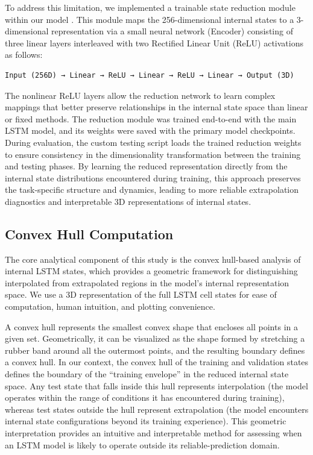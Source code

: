 \documentclass{article}
\begin{document}
To address this limitation, we implemented a trainable state reduction module within our model \cite{zamparo2015deep}. This module maps the 256-dimensional internal states to a 3-dimensional representation via a small neural network (Encoder) consisting of three linear layers interleaved with two Rectified Linear Unit (ReLU) activations as follows:

\begin{verbatim}
Input (256D) → Linear → ReLU → Linear → ReLU → Linear → Output (3D)
\end{verbatim}

The nonlinear ReLU layers allow the reduction network to learn complex mappings that better preserve relationships in the internal state space than linear or fixed methods. The reduction module was trained end-to-end with the main LSTM model, and its weights were saved with the primary model checkpoints. During evaluation, the custom testing script loads the trained reduction weights to ensure consistency in the dimensionality transformation between the training and testing phases. By learning the reduced representation directly from the internal state distributions encountered during training, this approach preserves the task-specific structure and dynamics, leading to more reliable extrapolation diagnostics and interpretable 3D representations of internal states.

\subsection{Convex Hull Computation}

The core analytical component of this study is the convex hull-based analysis of internal LSTM states, which provides a geometric framework for distinguishing interpolated from extrapolated regions in the model's internal representation space. We use a 3D representation of the full LSTM cell states for ease of computation, human intuition, and plotting convenience. 

A convex hull represents the smallest convex shape that encloses all points in a given set. Geometrically, it can be visualized as the shape formed by stretching a rubber band around all the outermost points, and the resulting boundary defines a convex hull. In our context, the convex hull of the training and validation states defines the boundary of the ``training envelope'' in the reduced internal state space. Any test state that falls inside this hull represents interpolation (the model operates within the range of conditions it has encountered during training), whereas test states outside the hull represent extrapolation (the model encounters internal state configurations beyond its training experience). This geometric interpretation provides an intuitive and interpretable method for assessing when an LSTM model is likely to operate outside its reliable-prediction domain.
\end{document}
